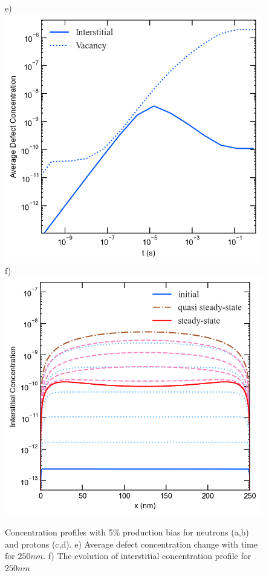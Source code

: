 \documentclass[utf8]{frontiersSCNS} %
\begin{document}
\begin{figure}[h!]
        e)\includegraphics[scale=0.55]{average_concentration_250nm}
        f)\includegraphics[scale=0.55]{interstitial_concentration_time_evolution_250nm}
        \caption{Concentration profiles with 5\% production bias for neutrons (a,b) and protons (c,d). e) Average defect concentration change with time for ${250nm}$. f) The evolution of interstitial concentration profile for ${250nm}$}
        \label{figure:concentrations_neutron_5_1e-6}
    \end{figure}\\
\end{document}
